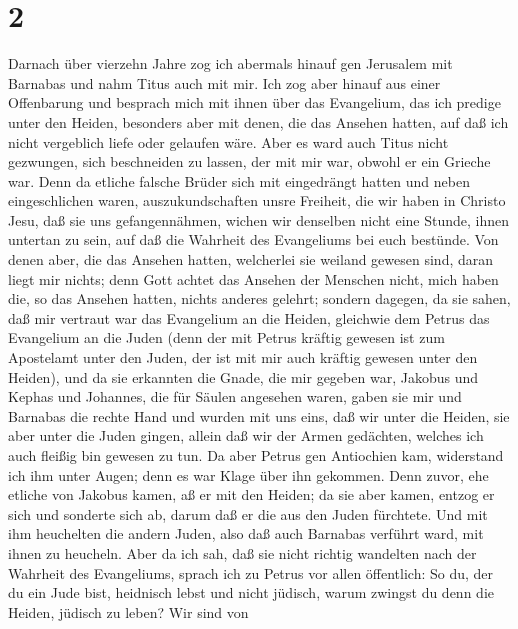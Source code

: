 \hypertarget{section-1}{%
\section{2}\label{section-1}}

 Darnach über vierzehn Jahre zog ich abermals hinauf gen
Jerusalem mit Barnabas und nahm Titus auch mit mir.  Ich zog
aber hinauf aus einer Offenbarung und besprach mich mit ihnen über das
Evangelium, das ich predige unter den Heiden, besonders aber mit denen,
die das Ansehen hatten, auf daß ich nicht vergeblich liefe oder gelaufen
wäre.  Aber es ward auch Titus nicht gezwungen, sich
beschneiden zu lassen, der mit mir war, obwohl er ein Grieche war.
 Denn da etliche falsche Brüder sich mit eingedrängt hatten
und neben eingeschlichen waren, auszukundschaften unsre Freiheit, die
wir haben in Christo Jesu, daß sie uns gefangennähmen, 
wichen wir denselben nicht eine Stunde, ihnen untertan zu sein, auf daß
die Wahrheit des Evangeliums bei euch bestünde.  Von denen
aber, die das Ansehen hatten, welcherlei sie weiland gewesen sind, daran
liegt mir nichts; denn Gott achtet das Ansehen der Menschen nicht, mich
haben die, so das Ansehen hatten, nichts anderes gelehrt; 
sondern dagegen, da sie sahen, daß mir vertraut war das Evangelium an
die Heiden, gleichwie dem Petrus das Evangelium an die Juden
 (denn der mit Petrus kräftig gewesen ist zum Apostelamt
unter den Juden, der ist mit mir auch kräftig gewesen unter den Heiden),
 und da sie erkannten die Gnade, die mir gegeben war,
Jakobus und Kephas und Johannes, die für Säulen angesehen waren, gaben
sie mir und Barnabas die rechte Hand und wurden mit uns eins, daß wir
unter die Heiden, sie aber unter die Juden gingen,  allein
daß wir der Armen gedächten, welches ich auch fleißig bin gewesen zu
tun.  Da aber Petrus gen Antiochien kam, widerstand ich ihm
unter Augen; denn es war Klage über ihn gekommen.  Denn
zuvor, ehe etliche von Jakobus kamen, aß er mit den Heiden; da sie aber
kamen, entzog er sich und sonderte sich ab, darum daß er die aus den
Juden fürchtete.  Und mit ihm heuchelten die andern Juden,
also daß auch Barnabas verführt ward, mit ihnen zu heucheln.
 Aber da ich sah, daß sie nicht richtig wandelten nach der
Wahrheit des Evangeliums, sprach ich zu Petrus vor allen öffentlich: So
du, der du ein Jude bist, heidnisch lebst und nicht jüdisch, warum
zwingst du denn die Heiden, jüdisch zu leben?  Wir sind von
